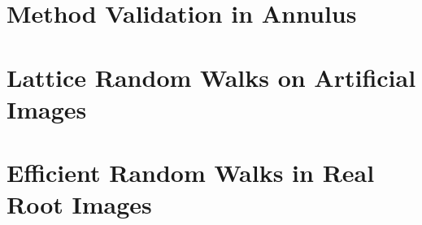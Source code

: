 \documentclass{uofsthesis-cs}
\begin{document}
\chapter{Method Validation in Annulus}

  

  

  

  


  
\chapter{Lattice Random Walks on Artificial Images}

  

  

  


\chapter{Efficient Random Walks in Real Root Images}
  
  

  

  
\end{document}

